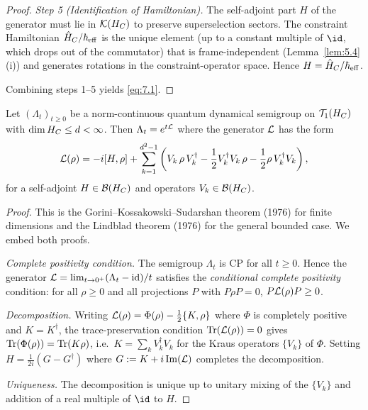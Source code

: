 \begin{proof}
\emph{Step 5 (Identification of Hamiltonian).}
The self-adjoint part $H$ of the generator must lie in $\mathcal{K}(H_C)$ to
preserve superselection sectors.  The constraint Hamiltonian
$\hat{H}_C / \hbar_{\mathrm{eff}}$ is the unique element (up to a
constant multiple of $\id$, which drops out of the commutator) that
is frame-independent (Lemma~\ref{lem:5.4}(i)) and generates rotations
in the constraint-operator space.  Hence $H = \hat{H}_C / \hbar_{\mathrm{eff}}$.

Combining steps 1--5 yields \eqref{eq:7.1}.
\end{proof}

\begin{lemma}
\label{lem:7.4}
Let $(\Lambda_t)_{t \geq 0}$ be a norm-continuous quantum dynamical
semigroup on $\mathcal{T}_1(H_C)$ with $\dim H_C \leq d < \infty$.
Then $\Lambda_t = e^{t\mathcal{L}}$ where the generator $\mathcal{L}$ has the form
\[
  \mathcal{L}(\rho) = -i[H, \rho] + \sum_{k=1}^{d^2 - 1}
  \left(
    V_k\,\rho\,V_k^\dagger
    - \frac{1}{2}V_k^\dagger V_k\,\rho
    - \frac{1}{2}\rho\,V_k^\dagger V_k
  \right),
\]
for a self-adjoint $H \in \mathcal{B}(H_C)$ and operators $V_k \in \mathcal{B}(H_C)$.
\end{lemma}

\begin{proof}
This is the Gorini--Kossakowski--Sudarshan theorem (1976) for finite
dimensions and the Lindblad theorem (1976) for the general bounded case.
We embed both proofs.

\emph{Complete positivity condition.}
The semigroup $\Lambda_t$ is CP for all $t \geq 0$.  Hence the
generator $\mathcal{L} = \lim_{t \to 0^+} (\Lambda_t - \mathrm{id})/t$
satisfies the \emph{conditional complete positivity} condition: for
all $\rho \geq 0$ and all projections $P$ with $P\rho P = 0$,
$P\mathcal{L}(\rho)P \geq 0$.

\emph{Decomposition.}
Writing $\mathcal{L}(\rho) = \Phi(\rho) - \frac{1}{2}\{K, \rho\}$ where
$\Phi$ is completely positive and $K = K^\dagger$, the trace-preservation
condition $\mathrm{Tr}(\mathcal{L}(\rho)) = 0$ gives $\mathrm{Tr}(\Phi(\rho)) = \mathrm{Tr}(K\rho)$,
i.e.\ $K = \sum_k V_k^\dagger V_k$ for the Kraus operators $\{V_k\}$ of
$\Phi$.  Setting $H = \frac{1}{2i}(G - G^\dagger)$ where
$G := K + i\,\mathrm{Im}(\mathcal{L})$ completes the decomposition.

\emph{Uniqueness.}
The decomposition is unique up to unitary mixing of the $\{V_k\}$ and
addition of a real multiple of $\id$ to $H$.
\end{proof}

